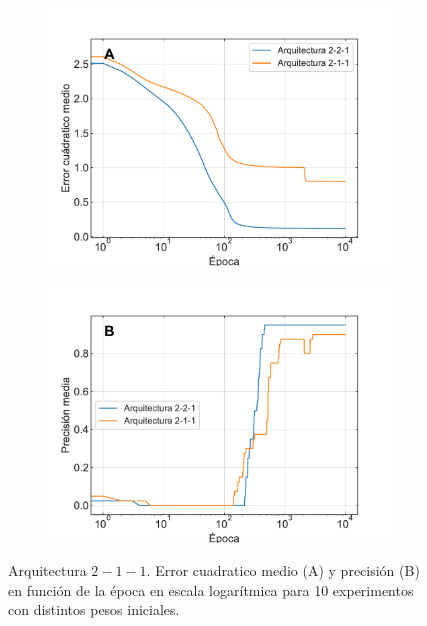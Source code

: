 \documentclass[11pt,twocolumn,twoside]{opticajnl}
\begin{document}
\begin{figure}[h]
    \centering
         \begin{subfigure}[b]{0.49\linewidth}
            \centering
            \includegraphics[width=1.1\textwidth]{Figuras/mseprom_ej1.pdf}
         \end{subfigure}
         \begin{subfigure}[b]{0.49\linewidth}
            \centering
            \includegraphics[width=1.1\textwidth]{Figuras/accprom_ej1.pdf}
         \end{subfigure}
    \caption{Arquitectura $2-1-1$. Error cuadratico medio (A) y precisión (B) en función de la época en escala logarítmica para 10 experimentos con distintos pesos iniciales.} 
    \label{fig:1prom}
\end{figure}
\end{document}
